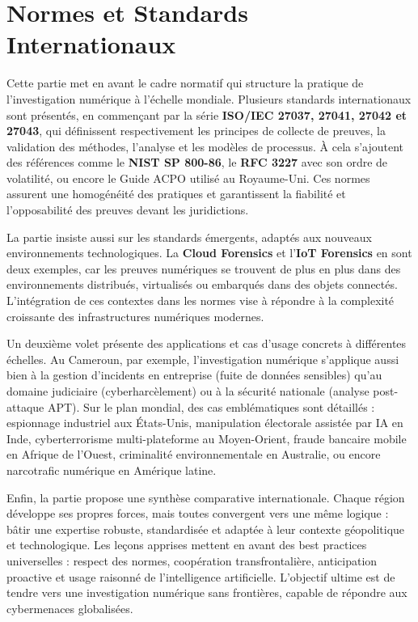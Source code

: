 \documentclass[memoire, 12pt]{report}
\begin{document}
\section*{Normes et Standards Internationaux}
Cette partie met en avant le cadre normatif qui structure la pratique de l’investigation numérique à l’échelle mondiale. Plusieurs standards internationaux sont présentés, en commençant par la série \textbf{ISO/IEC 27037, 27041, 27042 et 27043}, qui définissent respectivement les principes de collecte de preuves, la validation des méthodes, l’analyse et les modèles de processus. À cela s’ajoutent des références comme le \textbf{NIST SP 800-86}, le \textbf{RFC 3227} avec son ordre de volatilité, ou encore le Guide ACPO utilisé au Royaume-Uni. Ces normes assurent une homogénéité des pratiques et garantissent la fiabilité et l’opposabilité des preuves devant les juridictions.

La partie insiste aussi sur les standards émergents, adaptés aux nouveaux environnements technologiques. La \textbf{Cloud Forensics} et l’\textbf{IoT Forensics} en sont deux exemples, car les preuves numériques se trouvent de plus en plus dans des environnements distribués, virtualisés ou embarqués dans des objets connectés. L’intégration de ces contextes dans les normes vise à répondre à la complexité croissante des infrastructures numériques modernes.

Un deuxième volet présente des applications et cas d’usage concrets à différentes échelles. Au Cameroun, par exemple, l’investigation numérique s’applique aussi bien à la gestion d’incidents en entreprise (fuite de données sensibles) qu’au domaine judiciaire (cyberharcèlement) ou à la sécurité nationale (analyse post-attaque APT). Sur le plan mondial, des cas emblématiques sont détaillés : espionnage industriel aux États-Unis, manipulation électorale assistée par IA en Inde, cyberterrorisme multi-plateforme au Moyen-Orient, fraude bancaire mobile en Afrique de l’Ouest, criminalité environnementale en Australie, ou encore narcotrafic numérique en Amérique latine.

Enfin, la partie propose une synthèse comparative internationale. Chaque région développe ses propres forces, mais toutes convergent vers une même logique : bâtir une expertise robuste, standardisée et adaptée à leur contexte géopolitique et technologique. Les leçons apprises mettent en avant des best practices universelles : respect des normes, coopération transfrontalière, anticipation proactive et usage raisonné de l’intelligence artificielle. L’objectif ultime est de tendre vers une investigation numérique sans frontières, capable de répondre aux cybermenaces globalisées.
\end{document}

